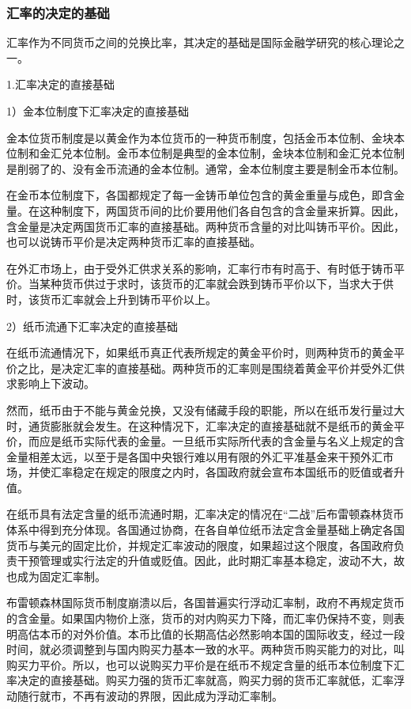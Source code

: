 \documentclass[12pt]{article}
\begin{document}
\subsubsection{汇率的决定的基础}
汇率作为不同货币之间的兑换比率，其决定的基础是国际金融学研究的核心理论之一。

1.汇率决定的直接基础

1）金本位制度下汇率决定的直接基础

金本位货币制度是以黄金作为本位货币的一种货币制度，包括金币本位制、金块本位制和金汇兑本位制。金币本位制是典型的金本位制，金块本位制和金汇兑本位制是削弱了的、没有金币流通的金本位制。通常，金本位制度主要是制金币本位制。

在金币本位制度下，各国都规定了每一金铸币单位包含的黄金重量与成色，即含金量。在这种制度下，两国货币间的比价要用他们各自包含的含金量来折算。因此，含金量是决定两国货币汇率的直接基础。两种货币含量的对比叫铸币平价。因此，也可以说铸币平价是决定两种货币汇率的直接基础。

在外汇市场上，由于受外汇供求关系的影响，汇率行市有时高于、有时低于铸币平价。当某种货币供过于求时，该货币的汇率就会跌到铸币平价以下，当求大于供时，该货币汇率就会上升到铸币平价以上。

2）纸币流通下汇率决定的直接基础

在纸币流通情况下，如果纸币真正代表所规定的黄金平价时，则两种货币的黄金平价之比，是决定汇率的直接基础。两种货币的汇率则是围绕着黄金平价并受外汇供求影响上下波动。

然而，纸币由于不能与黄金兑换，又没有储藏手段的职能，所以在纸币发行量过大时，通货膨胀就会发生。在这种情况下，汇率决定的直接基础就不是纸币的黄金平价，而应是纸币实际代表的金量。一旦纸币实际所代表的含金量与名义上规定的含金量相差太远，以至于是各国中央银行难以用有限的外汇平准基金来干预外汇市场，并使汇率稳定在规定的限度之内时，各国政府就会宣布本国纸币的贬值或者升值。

在纸币具有法定含量的纸币流通时期，汇率决定的情况在“二战”后布雷顿森林货币体系中得到充分体现。各国通过协商，在各自单位纸币法定含金量基础上确定各国货币与美元的固定比价，并规定汇率波动的限度，如果超过这个限度，各国政府负责干预管理或实行法定的升值或贬值。因此，此时期汇率基本稳定，波动不大，故也成为固定汇率制。

布雷顿森林国际货币制度崩溃以后，各国普遍实行浮动汇率制，政府不再规定货币的含金量。如果国内物价上涨，货币的对内购买力下降，而汇率仍保持不变，则表明高估本币的对外价值。本币比值的长期高估必然影响本国的国际收支，经过一段时间，就必须调整到与国内购买力基本一致的水平。两种货币购买能力的对比，叫购买力平价。所以，也可以说购买力平价是在纸币不规定含量的纸币本位制度下汇率决定的直接基础。购买力强的货币汇率就高，购买力弱的货币汇率就低，汇率浮动随行就市，不再有波动的界限，因此成为浮动汇率制。
\end{document}
